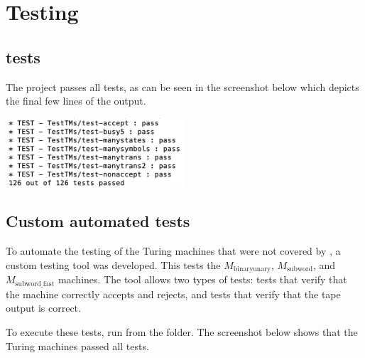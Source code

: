 \section{Testing}

\subsection{ tests}

The project passes all  tests, as can be seen in the screenshot below which depicts the final few lines of the output.

\begin{center}
    \includegraphics[width=0.5\textwidth]{images/screenshots/stacscheck.png}
\end{center}

\subsection{Custom automated tests}

To automate the testing of the Turing machines that were not covered by , a custom testing tool was developed. This tests the $M_\text{binaryunary}$, $M_\text{subword}$, and $M_\text{subword\_fast}$ machines. The tool allows two types of tests: tests that verify that the machine correctly accepts and rejects, and tests that verify that the tape output is correct. 

To execute these tests, run  from the  folder. The screenshot below shows that the Turing machines passed all tests.


